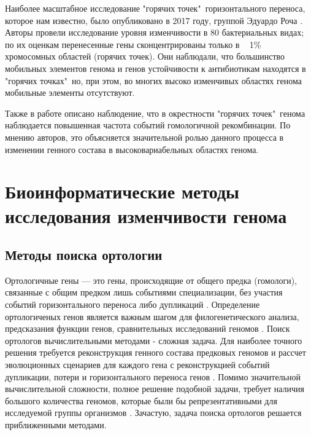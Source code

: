Наиболее масштабное исследование "горячих точек"\ горизонтального переноса, которое нам известно, было опубликовано в 2017 году, группой Эдуардо Роча \cite{oliveira2017chromosomal}. Авторы провели исследование уровня изменчивости в 80 бактериальных видах; по их оценкам перенесенные гены сконцентрированы только в ~ 1\% хромосомных областей (горячих точек). Они наблюдали, что большинство мобильных элементов генома и генов устойчивости к антибиотикам находятся в "горячих точках"\, но, при этом, во многих высоко изменчивых областях генома мобильные элементы отсутствуют. 

Также в работе \cite{oliveira2017chromosomal} описано наблюдение, что в окрестности "горячих точек"\ генома наблюдается повышенная частота событий гомологичной рекомбинации. По мнению авторов, это объясняется значительной ролью данного процесса в изменении генного состава в высоковариабельных областях генома.

\section{Биоинформатические методы исследования изменчивости генома}
\subsection{Методы поиска ортологии}
Ортологичные гены --- это гены, происходящие от общего предка (гомологи), связанные с общим предком лишь событиями специализации, без участия событий горизонтального переноса либо дупликаций \cite{fitch1970distinguishing}. Определение ортологиченых генов является важным шагом для филогенетического анализа, предсказания функции генов, сравнительных исследований геномов \cite{glover2019advances}. Поиск ортологов вычислительными методами - сложная задача. Для наиболее точного решения требуется реконструкция генного состава предковых геномов и рассчет эволюционных сценариев для каждого гена с реконструкцией событий дупликации, потери и горизонтального переноса генов \cite{glover2019advances}. Помимо значительной вычислительной сложности, полное решение подобной задачи, требует наличия большого количества геномов, которые были бы репрезентативными для исследуемой группы организмов \cite{theissen2002orthology}. Зачастую, задача поиска ортологов решается приближенными методами. 

